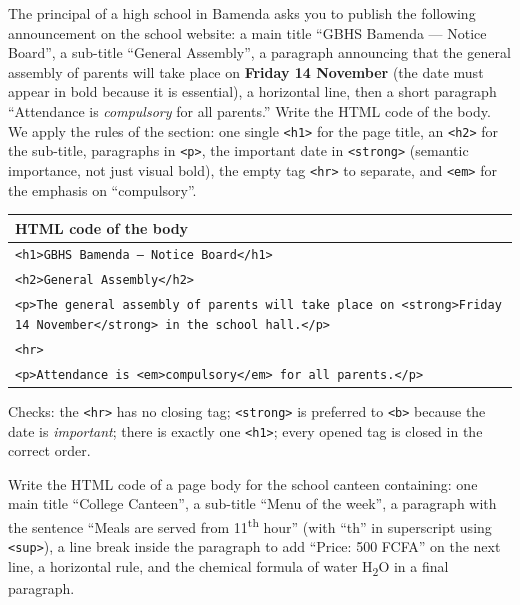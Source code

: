 \documentclass[11pt]{article}
\begin{document}
\begin{exoresolu}
The principal of a high school in Bamenda asks you to publish the following announcement on the school website: a main title ``GBHS Bamenda --- Notice Board'', a sub-title ``General Assembly'', a paragraph announcing that the general assembly of parents will take place on \textbf{Friday 14 November} (the date must appear in bold because it is essential), a horizontal line, then a short paragraph ``Attendance is \emph{compulsory} for all parents.'' Write the HTML code of the body.
\tcblower
We apply the rules of the section: one single \texttt{<h1>} for the page title, an \texttt{<h2>} for the sub-title, paragraphs in \texttt{<p>}, the important date in \texttt{<strong>} (semantic importance, not just visual bold), the empty tag \texttt{<hr>} to separate, and \texttt{<em>} for the emphasis on ``compulsory''.

\begin{center}
\begin{tabularx}{\linewidth}{|X|}
\hline
\rowcolor{popblueL} \textbf{HTML code of the body} \\
\hline
\texttt{<h1>GBHS Bamenda --- Notice Board</h1>} \\
\texttt{<h2>General Assembly</h2>} \\
\texttt{<p>The general assembly of parents will take place on <strong>Friday 14 November</strong> in the school hall.</p>} \\
\texttt{<hr>} \\
\texttt{<p>Attendance is <em>compulsory</em> for all parents.</p>} \\
\hline
\end{tabularx}
\end{center}

Checks: the \texttt{<hr>} has no closing tag; \texttt{<strong>} is preferred to \texttt{<b>} because the date is \emph{important}; there is exactly one \texttt{<h1>}; every opened tag is closed in the correct order.
\end{exoresolu}

\begin{exercice}
Write the HTML code of a page body for the school canteen containing: one main title ``College Canteen'', a sub-title ``Menu of the week'', a paragraph with the sentence ``Meals are served from 11\textsuperscript{th} hour'' (with ``th'' in superscript using \texttt{<sup>}), a line break inside the paragraph to add ``Price: 500 FCFA'' on the next line, a horizontal rule, and the chemical formula of water H\textsubscript{2}O in a final paragraph.
\end{exercice}
\end{document}
